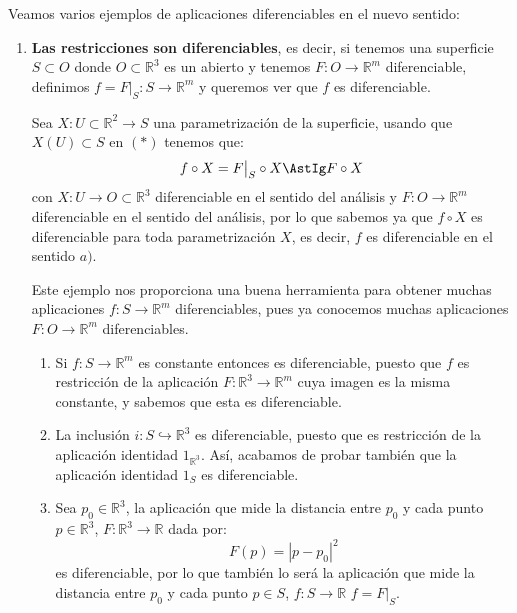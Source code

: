 \begin{ejemplo}
    Veamos varios ejemplos de aplicaciones diferenciables en el nuevo sentido:
    \begin{enumerate}
        \item \textbf{Las restricciones son diferenciables}, es decir, si tenemos una superficie $S\subset O$ donde $O\subset \mathbb{R}^3$ es un abierto y tenemos $F:O\to \mathbb{R}^m$ diferenciable, definimos $f=F\big|_S:S\to \mathbb{R}^m$ y queremos ver que $f$ es diferenciable.

            Sea $X:U\subset\mathbb{R}^2\to S$ una parametrización de la superficie, usando que $X(U)\subset S$ en $(\ast)$ tenemos que: 
            \begin{equation*}
                f\circ X = F\big|_S \circ X \AstIg F\circ X
            \end{equation*}
            con $X:U\to O\subset \mathbb{R}^3$ diferenciable en el sentido del análisis y $F:O\to \mathbb{R}^m$ diferenciable en el sentido del análisis, por lo que sabemos ya que $f\circ X$ es diferenciable para toda parametrización $X$, es decir, $f$ es diferenciable en el sentido $a)$.

            Este ejemplo nos proporciona una buena herramienta para obtener muchas aplicaciones $f:S\to \mathbb{R}^m$ diferenciables, pues ya conocemos muchas aplicaciones $F:O\to \mathbb{R}^m$ diferenciables.
    \begin{enumerate}
        \item Si $f:S\to\mathbb{R}^m$ es constante entonces es diferenciable, puesto que $f$ es restricción de la aplicación $F:\mathbb{R}^3\to\mathbb{R}^m$ cuya imagen es la misma constante, y sabemos que esta es diferenciable.

        \item La inclusión $i:S\hookrightarrow\mathbb{R}^3$ es diferenciable, puesto que es restricción de la aplicación identidad $1_{\mathbb{R}^3}$. Así, acabamos de probar también que la aplicación identidad $1_S$ es diferenciable.
        \item Sea $p_0\in \mathbb{R}^3$, la aplicación que mide la distancia entre $p_0$ y cada punto $p\in \mathbb{R}^3$, $F:\mathbb{R}^3\to\mathbb{R}$ dada por:
            \begin{equation*}
                F(p) = |p-p_0|^2
            \end{equation*}
            es diferenciable, por lo que también lo será la aplicación que mide la distancia entre $p_0$ y cada punto $p\in S$, $f:S\to\mathbb{R}$ $f = F\big|_S$.\\


\end{enumerate}
\end{enumerate}
\end{ejemplo}
